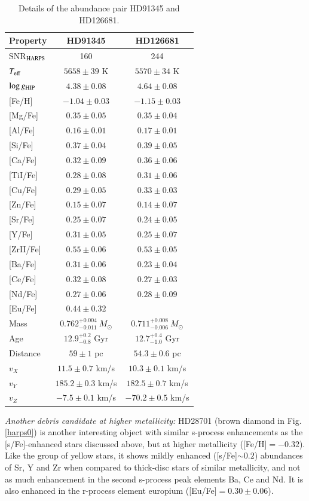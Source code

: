 \documentclass{aa}  %
\begin{document}
\begin{table}
\label{twins}
\centering
\caption{Details of the abundance pair HD91345 and HD126681.}
\begin{tabular}{lcc}
Property & HD91345 & HD126681 \\
\hline \hline
SNR$_{\rm HARPS}$ & 160 & 244 \\
$T_{\rm eff}$ & $5658\pm39$ K & $5570\pm34$ K \\
$\log g_{\rm HIP}$ & $4.38\pm0.08$ & $4.64\pm0.08$ \\
{[Fe/H]  }& $-1.04\pm0.03$ & $-1.15\pm0.03$ \\
{[Mg/Fe] }& $0.35\pm0.05$ & $0.35\pm0.04$ \\
{[Al/Fe] }& $0.16\pm0.01$ & $0.17\pm0.01$ \\
{[Si/Fe] }& $0.37\pm0.04$ & $0.39\pm0.05$ \\
{[Ca/Fe] }& $0.32\pm0.09$ & $0.36\pm0.06$ \\
{[TiI/Fe]} & $0.28\pm0.08$ & $0.31\pm0.06$ \\
{[Cu/Fe] }& $0.29\pm0.05$ & $0.33\pm0.03$ \\
{[Zn/Fe] }& $0.15\pm0.07$ & $0.14\pm0.07$ \\
{[Sr/Fe] }& $0.25\pm0.07$ & $0.24\pm0.05$ \\
{[Y/Fe]  }& $0.31\pm0.05$ & $0.25\pm0.07$ \\
{[ZrII/Fe]} & $0.55\pm0.06$ & $0.53\pm0.05$ \\
{[Ba/Fe]} & $0.31\pm0.06$ & $0.23\pm0.04$ \\
{[Ce/Fe]} & $0.32\pm0.08$ & $0.27\pm0.03$ \\
{[Nd/Fe]} & $0.27\pm0.06$ & $0.28\pm0.09$ \\
{[Eu/Fe]} & $0.44\pm0.32$ &  \\
\hline
Mass & $0.762^{+0.004}_{-0.011}\ M_{\odot}$  & $0.711^{+0.008}_{-0.006}\ M_{\odot}$ \\
Age & $12.9^{+0.2}_{-0.8}$ Gyr & $12.7^{+0.4}_{-1.0}$ Gyr \\
Distance & $59\pm1$ pc & $54.3\pm0.6$ pc\\
$v_X$ & $11.5\pm0.7$ km/s & $10.3\pm0.1$ km/s \\
$v_Y$ & $185.2\pm0.3$ km/s & $182.5\pm0.7$ km/s \\
$v_Z$ & $-7.5\pm0.1$ km/s & $-70.2\pm0.5$ km/s \\
\hline\hline
\end{tabular}
\end{table}

{\it Another debris candidate at higher metallicity:} HD28701 (brown diamond in Fig. \ref{harps0}) is another interesting object with similar s-process enhancements as the [s/Fe]-enhanced stars discussed above, but at higher metallicity ([Fe/H]$=-0.32$). Like the group of yellow stars, it shows mildly enhanced ([s/Fe]$\sim0.2$) abundances of Sr, Y and Zr when compared to thick-disc stars of similar metallicity, and not as much enhancement in the second s-process peak elements Ba, Ce and Nd. It is also enhanced in the r-process element europium ([Eu/Fe]$=0.30\pm0.06$). 
\end{document}
